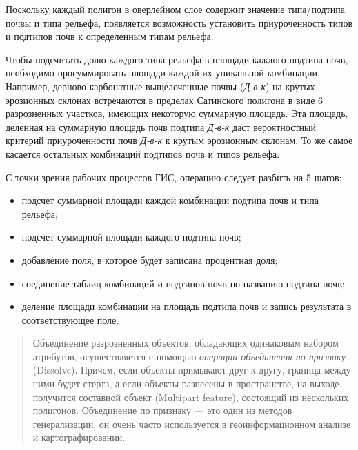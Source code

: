 \documentclass[
  12pt,
]{book}
\begin{document}
Поскольку каждый полигон в оверлейном слое содержит значение типа/подтипа почвы и типа рельефа, появляется возможность установить приуроченность типов и подтипов почв к определенным типам рельефа.

Чтобы подсчитать долю каждого типа рельефа в площади каждого подтипа почв, необходимо просуммировать площади каждой их уникальной комбинации. Например, дерново-карбонатные выщелоченные почвы (\emph{Д-в-к}) на крутых эрозионных склонах встречаются в пределах Сатинского полигона в виде 6 разрозненных участков, имеющих некоторую суммарную площадь. Эта площадь, деленная на суммарную площадь почв подтипа \emph{Д-в-к} даст вероятностный критерий приуроченности почв \emph{Д-в-к} к крутым эрозионным склонам. То же самое касается остальных комбинаций подтипов почв и типов рельефа.

С точки зрения рабочих процессов ГИС, операцию следует разбить на 5 шагов:

\begin{itemize}
\item
  подсчет суммарной площади каждой комбинации подтипа почв и типа рельефа;
\item
  подсчет суммарной площади каждого подтипа почв;
\item
  добавление поля, в которое будет записана процентная доля;
\item
  соединение таблиц комбинаций и подтипов почв по названию подтипа почв;
\item
  деление площади комбинации на площадь подтипа почв и запись результата в соответствующее поле.
\end{itemize}

\begin{quote}
Объединение разрозненных объектов, обладающих одинаковым набором атрибутов, осуществляется с помощью \emph{операции объединения по признаку} (Dissolve). Причем, если объекты примыкают друг к другу, граница между ними будет стерта, а если объекты разнесены в пространстве, на выходе получится составной объект (Multipart feature), состоящий из нескольких полигонов. Объединение по признаку --- это один из методов генерализации, он очень часто используется в геоинформационном анализе и картографировании.
\end{quote}
\end{document}
